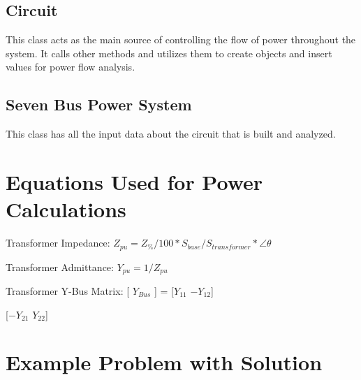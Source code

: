 \documentclass{article}
\begin{document}
	\subsection{Circuit}
	This class acts as the main source of controlling the flow of power throughout the system. It calls other methods and utilizes them to create objects and insert values for power flow analysis.
	
	\subsection{Seven Bus Power System}
	This class has all the input data about the circuit that is built and analyzed.
	
	\section{Equations Used for Power Calculations}
	\noindent
	Transformer Impedance: $Z_{pu} = Z_\% / 100 * S_{base} / S_{transformer} * \angle{\theta}$
	
	\noindent
	Transformer Admittance: $Y_{pu} = 1 / Z_{pu}$
	
	\noindent
	Transformer Y-Bus Matrix: [ $Y_{Bus}$ ] = [$Y_{11}$ $-Y_{12}$]
	
	\noindent
	\phantom{Transformer Y-Bus Matrix: [ $Y_{Bus}$ ] = }[$-Y_{21}$ $Y_{22}$]
	
	\section{Example Problem with Solution}
	
\end{document}
